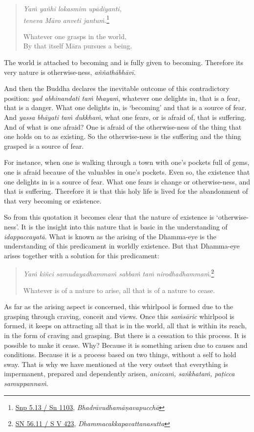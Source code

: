 \begin{quote}
\emph{Yaṁ yañhi lokasmim upādiyanti,}\\
\emph{teneva Māro anveti jantuṁ.}\footnote{\href{https://suttacentral.net/snp5.13/pli/ms}{Snp 5.13 / Sn 1103}, \emph{Bhadrāvudhamāṇavapucchā}}

Whatever one grasps in the world,\\
By that itself Māra pursues a being.
\end{quote}

The world is attached to becoming and is fully given to becoming. Therefore its very nature is otherwise-ness, \emph{aññathābhāvī}.

And then the Buddha declares the inevitable outcome of this contradictory position: \emph{yad abhinandati taṁ bhayaṁ}, whatever one delights in, that is a fear, that is a danger. What one delights in, is `becoming' and that is a source of fear. And \emph{yassa bhāyati taṁ dukkhaṁ}, what one fears, or is afraid of, that is suffering. And of what is one afraid? One is afraid of the otherwise-ness of the thing that one holds on to as existing. So the otherwise-ness is the suffering and the thing grasped is a source of fear.

For instance, when one is walking through a town with one's pockets full of gems, one is afraid because of the valuables in one's pockets. Even so, the existence that one delights in is a source of fear. What one fears is change or otherwise-ness, and that is suffering. Therefore it is that this holy life is lived for the abandonment of that very becoming or existence.

So from this quotation it becomes clear that the nature of existence is `otherwise-ness'. It is the insight into this nature that is basic in the understanding of \emph{idappaccayatā}. What is known as the arising of the Dhamma-eye is the understanding of this predicament in worldly existence. But that Dhamma-eye arises together with a solution for this predicament:

\begin{quote}
\emph{Yaṁ kiñci samudayadhammaṁ sabbaṁ taṁ nirodhadhammaṁ}.\footnote{\href{https://suttacentral.net/sn56.11/pli/ms}{SN 56.11 / S V 423}, \emph{Dhammacakkapavattanasutta}}

Whatever is of a nature to arise, all that is of a nature to cease.
\end{quote}

As far as the arising aspect is concerned, this whirlpool is formed due to the grasping through craving, conceit and views. Once this \emph{saṁsāric} whirlpool is formed, it keeps on attracting all that is in the world, all that is within its reach, in the form of craving and grasping. But there is a cessation to this process. It is possible to make it cease. Why? Because it is something arisen due to causes and conditions. Because it is a process based on two things, without a self to hold sway. That is why we have mentioned at the very outset that everything is impermanent, prepared and dependently arisen, \emph{aniccaṁ, saṅkhataṁ, paṭicca samuppannaṁ}.

